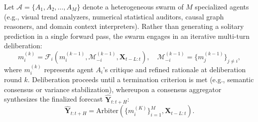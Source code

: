 Let $\mathcal{A} = \{A_1, A_2, \dots, A_M\}$ denote a heterogeneous swarm of $M$ specialized agents (e.g., visual trend analyzers, numerical statistical auditors, causal graph reasoners, and domain context interpreters). Rather than generating a solitary prediction in a single forward pass, the swarm engages in an iterative multi-turn deliberation:
\begin{equation}
    m_i^{(k)} = \mathcal{F}_i\left(m_i^{(k-1)}, \mathcal{M}_{-i}^{(k-1)}, \mathbf{X}_{t-L:t}\right), \quad \mathcal{M}_{-i}^{(k-1)} = \{m_j^{(k-1)}\}_{j \neq i},
\end{equation}
where $m_i^{(k)}$ represents agent $A_i$'s critique and refined rationale at deliberation round $k$. Deliberation proceeds until a termination criterion is met (e.g., semantic consensus or variance stabilization), whereupon a consensus aggregator synthesizes the finalized forecast $\hat{\mathbf{Y}}_{t:t+H}$:
\begin{equation}
    \hat{\mathbf{Y}}_{t:t+H} = \text{Arbiter}\left(\{m_i^{(K)}\}_{i=1}^M, \mathbf{X}_{t-L:t}\right).
\end{equation}

